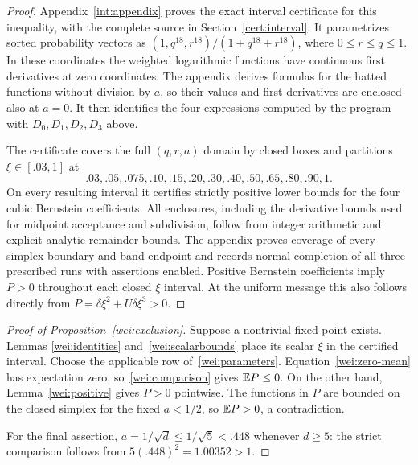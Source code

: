 \begin{proof}
Appendix~\ref{int:appendix} proves the exact interval certificate for
this inequality, with the complete source in
Section~\ref{cert:interval}.  It parametrizes sorted probability vectors
as $(1,q^{18},r^{18})/(1+q^{18}+r^{18})$, where $0\le r\le q\le1$.
In these coordinates the weighted logarithmic functions have continuous
first derivatives at zero coordinates.  The appendix derives formulas
for the hatted functions without division by $a$, so their values and
first derivatives are enclosed also at $a=0$.  It then identifies the
four expressions computed by the program with
$D_0,D_1,D_2,D_3$ above.

The certificate covers the full $(q,r,a)$ domain by closed boxes and
partitions $\xi\in[.03,1]$ at
\[
 .03,.05,.075,.10,.15,.20,.30,.40,.50,.65,.80,.90,1.
\]
On every resulting interval it certifies strictly positive lower bounds
for the four cubic Bernstein coefficients.  All enclosures, including
the derivative bounds used for midpoint acceptance and subdivision,
follow from integer
arithmetic and explicit analytic remainder bounds.  The appendix proves
coverage of every simplex boundary and band endpoint and records normal
completion of all three prescribed runs with assertions enabled.
Positive Bernstein coefficients imply $P>0$ throughout each closed
$\xi$ interval.  At the uniform message this also follows directly from
$P=\delta\xi^2+U\delta\xi^3>0$.
\end{proof}

\begin{proof}[Proof of Proposition~\ref{wei:exclusion}]
Suppose a nontrivial fixed point exists.  Lemmas
\ref{wei:identities} and~\ref{wei:scalarbounds} place its scalar $\xi$
in the certified interval.  Choose the applicable row
of~\eqref{wei:parameters}.  Equation~\eqref{wei:zero-mean} has
expectation zero, so~\eqref{wei:comparison} gives $\mathbb E P\le0$.
On the other hand, Lemma~\ref{wei:positive} gives $P>0$ pointwise.
The functions in $P$ are bounded on the closed simplex for the fixed
$a<1/2$, so $\mathbb E P>0$, a contradiction.

For the final assertion, $a=1/\sqrt d\le1/\sqrt5<.448$ whenever
$d\ge5$: the strict comparison follows from
$5(.448)^2=1.00352>1$.
\end{proof}
